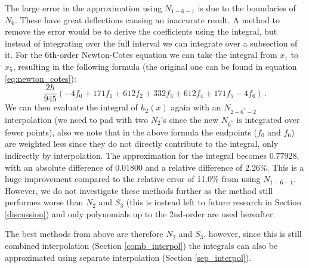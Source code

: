 The large error in the approximation using $N_{1-6-1}$ is due to the boundaries of $N_6$.
These have great deflections causing an inaccurate result.
A method to remove the error would be to derive the coefficients using the integral, but instead of integrating over the full interval we can integrate over a subsection of it.
For the 6th-order Newton-Cotes equation we can take the integral from $x_1$ to $x_5$, resulting in the following formula (the original one can be found in equation \ref{eq:newton_cotes}):
\begin{equation}
   \frac{2h}{945}(-4f_0 + 171f_1 + 612f_2 + 332f_3 + 612f_4 + 171f_5 - 4f_6) \,. \label{eq:6star}
\end{equation}
We can then evaluate the integral of $h_2(x)$ again with an $N_{2-6^*-2}$ interpolation (we need to pad with two $N_2$'s since the new $N_{6^*}$ is integrated over fewer points), also we note that in the above formula the endpoints ($f_0$ and $f_6$) are weighted less since they do not directly contribute to the integral, only indirectly by interpolation.
The approximation for the integral becomes 0.77928, with an absolute difference of 0.01800 and a relative difference of 2.26\%.
This is a huge improvement compared to the relative error of 11.0\% from using $N_{1-6-1}$.
However, we do not investigate these methods further as the method still performes worse than $N_2$ and $S_3$ (this is instead left to future research in Section \ref{discussion}) and only polynomials up to the 2nd-order are used hereafter.

The best methods from above are therefore $N_2$ and $S_3$, however, since this is still combined interpolation (Section \ref{comb_interpol}) the integrals can also be approximated using separate interpolation (Section \ref{sep_interpol}).


